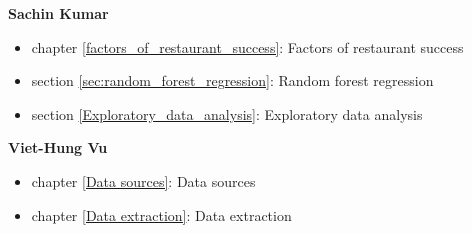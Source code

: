 \documentclass[a4paper, 11pt, oneside]{Thesis}  %
\begin{document}
\textbf{Sachin Kumar}
\begin{itemize}
\item chapter \ref{factors_of_restaurant_success}: Factors of restaurant success
\item section \ref{sec:random_forest_regression}: Random forest regression
\item section \ref{Exploratory_data_analysis}: Exploratory data analysis
\end{itemize}

\textbf{Viet-Hung Vu}
\begin{itemize}
\item chapter \ref{Data sources}: Data sources
\item chapter \ref{Data extraction}: Data extraction
\end{itemize}


\clearpage

\end{document}
